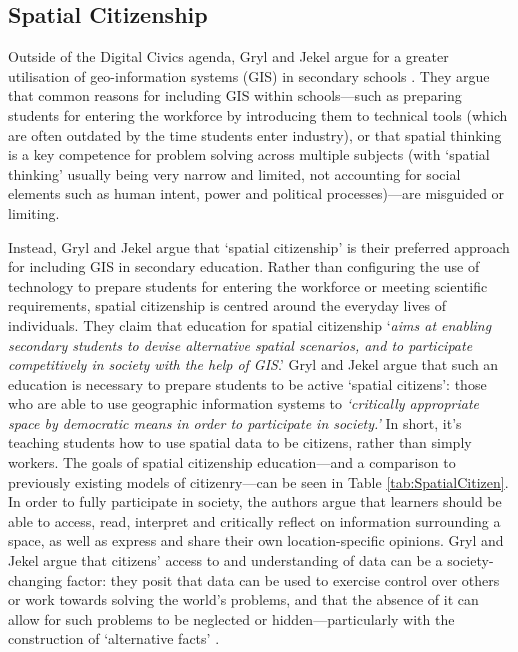 \subsection{Spatial Citizenship}

Outside of the Digital Civics agenda, Gryl and Jekel argue for a greater utilisation of geo-information systems (GIS) in secondary schools \citep{Gryl2012}. They argue that common reasons for including GIS within schools---such as preparing students for entering the workforce by introducing them to technical tools (which are often outdated by the time students enter industry), or that spatial thinking is a key competence for problem solving across multiple subjects (with `spatial thinking' usually being very narrow and limited, not accounting for social elements such as human intent, power and political processes)---are misguided or limiting. 

Instead, Gryl and Jekel argue that `spatial citizenship' is their preferred approach for including GIS in secondary education. Rather than configuring the use of technology to prepare students for entering the workforce or meeting scientific requirements, spatial citizenship is centred around the everyday lives of individuals. They claim that education for spatial citizenship `\textit{aims at enabling secondary students to devise alternative spatial scenarios, and to participate competitively in society with the help of GIS}.' Gryl and Jekel argue that such an education is necessary to prepare students to be active `spatial citizens': those who are able to use geographic information systems to \textit{`critically appropriate space by democratic means in order to participate in society.’} In short, it's teaching students how to use spatial data to be citizens, rather than simply workers. The goals of spatial citizenship education---and a comparison to previously existing models of citizenry---can be seen in Table \ref{tab:SpatialCitizen}. In order to fully participate in society, the authors argue that learners should be able to access, read, interpret and critically reflect on information surrounding a space, as well as express and share their own location-specific opinions. Gryl and Jekel argue that citizens' access to and understanding of data can be a society-changing factor: they posit that data can be used to exercise control over others or work towards solving the world's problems, and that the absence of it can allow for such problems to be neglected or hidden---particularly with the construction of `alternative facts' \citep{gryl2018}. 

